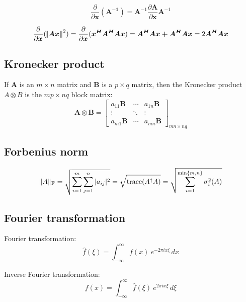 \documentclass[12pt]{article}
\numberwithin{equation}{section}
\begin{document}
\begin{equation}\label{eq:matrixderivativ3}
	\frac{\partial}{\partial \bm{x}}(\bm{A^{-1}}) = 
	\bm{A}^{-1} \frac{\partial \bm{A}}{\partial \bm{x}} \bm{A}^{-1}
\end{equation}

\begin{equation}\label{eq:matrixderivativ4}
	\frac{\partial}{\partial \bm{x}}(\norm{\bm{Ax}}^2) 
	= \frac{\partial}{\partial \bm{x}} (\bm{x^HA^HAx} )
	= \bm{A^HAx + A^HAx} = 2\bm{A^HAx}
\end{equation}
\subsection{Kronecker product} \label{ch:kronecker}
If \textbf{A} is an $m \times n$ matrix and \textbf{B} is a $p \times q$ matrix, then the Kronecker product $A \otimes B$ is the $mp  \times nq$ block matrix:
\begin{equation}
	\mathbf{A}\otimes\mathbf{B} = 
	\begin{bmatrix} 
		a_{11} \mathbf{B} & \cdots & a_{1n}\mathbf{B} \\ 
		\vdots & \ddots & \vdots 
		\\ a_{m1} \mathbf{B} & \cdots & a_{mn} \mathbf{B} 
	\end{bmatrix}_{mn\times nq}
\end{equation} \par
\subsection{Forbenius norm} \label{ch:forbenius}
\begin{equation}
	\|A\|_{\rm F} = \sqrt{\sum_{i=1}^m \sum_{j=1}^n |a_{ij}|^2} = \sqrt{\operatorname{trace}(A^\dagger A)} = \sqrt{\sum_{i=1}^{\min\{m, n\}} \sigma_i^2(A)}
\end{equation}
\subsection{Fourier transformation}
Fourier transformation:
\begin{equation}\label{eq:fourierTrans}
	\hat{f}(\xi) = \int_{-\infty}^{\infty} f(x)\ e^{-2\pi i x \xi}\,dx
\end{equation} \par
Inverse Fourier transformation: 
\begin{equation}
	f(x) = \int_{-\infty}^{\infty} \hat f(\xi)\ e^{2 \pi i x \xi}\,d\xi
\end{equation} \par
\end{document}
